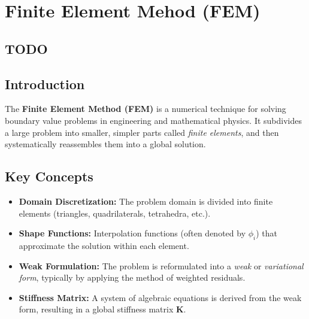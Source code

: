 \chapter{Finite Element Mehod (FEM)}

\section{TODO}
\cite{2014/35/EU}

\section{Introduction}
The \textbf{Finite Element Method (FEM)} is a numerical technique for solving boundary value problems in engineering and mathematical physics. It subdivides a large problem into smaller, simpler parts called \textit{finite elements}, and then systematically reassembles them into a global solution.

\section{Key Concepts}
\begin{itemize}
    \item \textbf{Domain Discretization:} The problem domain is divided into finite elements (triangles, quadrilaterals, tetrahedra, etc.).
    \item \textbf{Shape Functions:} Interpolation functions (often denoted by $\phi_i$) that approximate the solution within each element.
    \item \textbf{Weak Formulation:} The problem is reformulated into a \textit{weak} or \textit{variational form}, typically by applying the method of weighted residuals.
    \item \textbf{Stiffness Matrix:} A system of algebraic equations is derived from the weak form, resulting in a global stiffness matrix $\mathbf{K}$.
\end{itemize}

